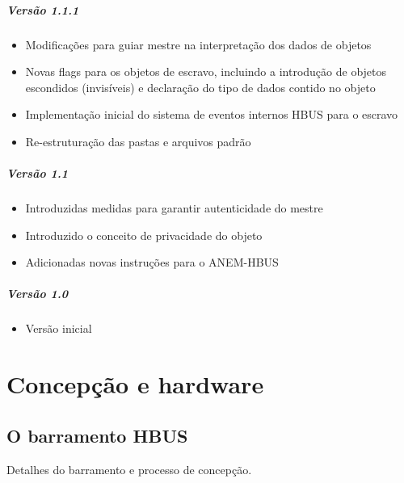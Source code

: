 \documentclass[11pt]{report}
\begin{document}
\subsubsection{Versão 1.1.1}

\begin{itemize}

\item Modificações para guiar mestre na interpretação dos dados de objetos
\item Novas flags para os objetos de escravo, incluindo a introdução de objetos escondidos (invisíveis) e declaração do tipo de dados contido no objeto
\item Implementação inicial do sistema de eventos internos HBUS para o escravo
\item Re-estruturação das pastas e arquivos padrão

\end{itemize}

\subsubsection{Versão 1.1}

\begin{itemize}
\item Introduzidas medidas para garantir autenticidade do mestre
\item Introduzido o conceito de privacidade do objeto
\item Adicionadas novas instruções para o ANEM-HBUS
\end{itemize}

\subsubsection{Versão 1.0}
\begin{itemize}

\item Versão inicial

\end{itemize}

\part{Concepção e hardware}

\chapter{O barramento HBUS}

Detalhes do barramento e processo de concepção.
\end{document}
